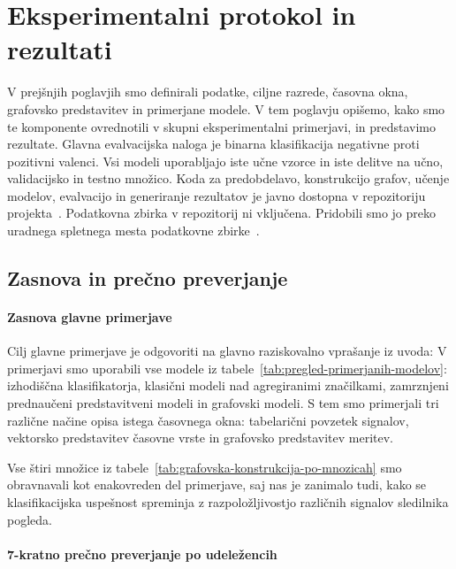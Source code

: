 \chapter{Eksperimentalni protokol in rezultati}
\label{sec:eksperimenti}
\label{sec:rezultati}

V prejšnjih poglavjih smo definirali podatke, ciljne razrede, časovna okna, grafovsko predstavitev in primerjane modele.
V tem poglavju opišemo, kako smo te komponente ovrednotili v skupni eksperimentalni primerjavi, in predstavimo rezultate.
Glavna evalvacijska naloga je binarna klasifikacija negativne proti pozitivni valenci.
Vsi modeli uporabljajo iste učne vzorce in iste delitve na učno, validacijsko in testno množico.
Koda za predobdelavo, konstrukcijo grafov, učenje modelov, evalvacijo in generiranje rezultatov je javno dostopna v repozitoriju projekta~\cite{bozak2026gfmrepo}.
Podatkovna zbirka \MAHNOB{} v repozitorij ni vključena. 
Pridobili smo jo preko uradnega spletnega mesta podatkovne zbirke~\cite{mahnobwebsite}.

\section{Zasnova in prečno preverjanje}
\label{subsec:zasnova-glavne-primerjave}
\label{subsec:validacijski-protokol}

\subsubsection*{Zasnova glavne primerjave}

Cilj glavne primerjave je odgovoriti na glavno raziskovalno vprašanje iz uvoda: \rvGlavnoBesedilo{}
V primerjavi smo uporabili vse modele iz tabele~\ref{tab:pregled-primerjanih-modelov}: izhodiščna klasifikatorja, klasični modeli nad agregiranimi značilkami, zamrznjeni prednaučeni predstavitveni modeli in grafovski modeli.
S tem smo primerjali tri različne načine opisa istega časovnega okna: tabelarični povzetek signalov, vektorsko predstavitev časovne vrste in grafovsko predstavitev meritev.

Vse štiri množice iz tabele~\ref{tab:grafovska-konstrukcija-po-mnozicah} smo obravnavali kot enakovreden del primerjave, saj nas je zanimalo tudi, kako se klasifikacijska uspešnost spreminja z razpoložljivostjo različnih signalov sledilnika pogleda.


\subsubsection*{7-kratno prečno preverjanje po udeležencih}
\label{subsec:subject-7kratno}


